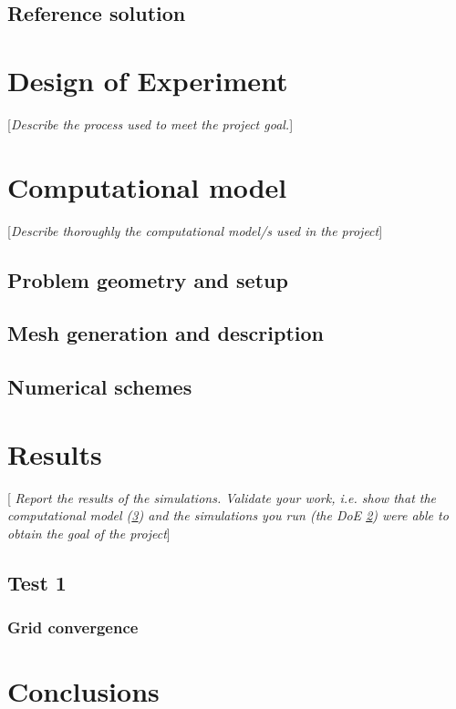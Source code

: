 \documentclass[11pt,english, openany]{book}
\begin{document}
\section{Reference solution}

\chapter{Design of Experiment}\label{chapt:doe}
[\textit{Describe the process used to meet the project goal.}]

\chapter{Computational model}\label{chapt:model}
[\textit{Describe thoroughly the computational model/s used in the project}]
\section{Problem geometry and setup}
\section{Mesh generation and description}
\section{Numerical schemes}

\chapter{Results}\label{chapt:results}
[\textit{ Report the results of the simulations. Validate your work, i.e. show that the computational model (\ref{chapt:model}) and the simulations you run (the DoE \ref{chapt:doe}) were able to obtain the goal of the project}]
\section{Test 1}
\subsection{Grid convergence}

\chapter{Conclusions}
\end{document}
